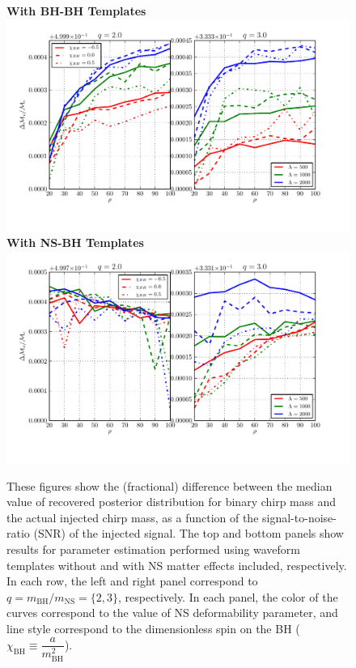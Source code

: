 \documentclass[aps,prd,amsmath,floats,floatfix, twocolumn,
superscriptaddress,nofootinbib,showpacs]{revtex4-1}
\begin{document}
\begin{figure}[h]
\centering 
\textbf{With BH-BH Templates}
\includegraphics[width=2\columnwidth]{plots/TN_chirpMassBias_vs_SNR_q23.pdf}\\ 
\textbf{With NS-BH Templates}
\includegraphics[width=2\columnwidth]{plots/TT_chirpMassBias_vs_SNR_q23.pdf}%
\caption{These figures show the (fractional) difference between the median value of
recovered posterior distribution for binary chirp mass and the actual injected chirp mass,
as a function of the signal-to-noise-ratio (SNR) of the injected signal.
The top and bottom panels show results for parameter estimation performed using
waveform templates without and with NS matter effects included, respectively.
In each row, the left and right panel correspond to 
$q=m_\mathrm{BH}/m_\mathrm{NS}=\{2,3\}$, respectively. 
In each panel, the color of the curves correspond to the value of NS deformability 
parameter, and line style correspond to the dimensionless spin on the BH 
($\chi_\mathrm{BH}\equiv \dfrac{a}{m_\mathrm{BH}^2}$).
}
\label{fig:TNT_chirpMassBias_vs_SNR_q23}
\end{figure}
\end{document}
